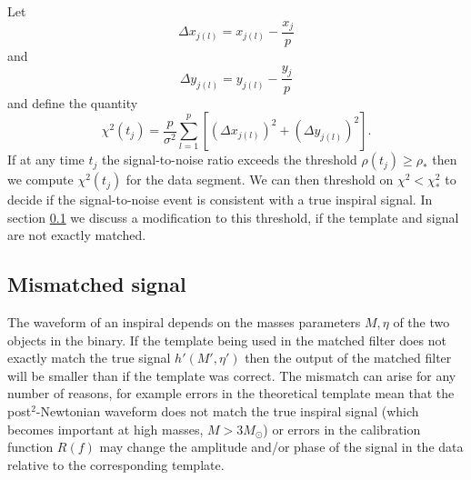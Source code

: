 Let
\begin{equation}
\Delta x_{j(l)} = x_{j(l)} - \frac{x_j}{p}
\end{equation}
and
\begin{equation}
\Delta y_{j(l)} = y_{j(l)} - \frac{y_j}{p}
\end{equation}
and define the quantity
\begin{equation}
\chi^2(t_j) = \frac{p}{\sigma^2} \sum_{l = 1}^p \left[ \left(\Delta x_{j(l)}\right)^2 + \left(\Delta y_{j(l)}\right)^2 \right].
\label{eq:chisqdefn}
\end{equation}
If at any time $t_j$ the signal-to-noise ratio
exceeds the threshold $\rho(t_j) \ge \rho_\ast$ then we compute $\chi^2(t_j)$
 for the data segment. We can then threshold on $\chi^2 < \chi^2_\ast$ to
decide if the signal-to-noise event is consistent with a true inspiral signal.
In section \ref{ss:mismatchedchisq} we discuss a modification to this
threshold, if the template and signal are not exactly matched.

\subsection{Mismatched signal}
\label{ss:mismatchedchisq}

The waveform of an inspiral depends on the masses parameters $M,\eta$ of the two
objects in the binary. If the template being used in the
matched filter does not exactly match the true signal
$h'(M',\eta')$ then the output of the matched filter will be smaller than if
the template was correct. The mismatch can arise for any number of reasons,
for example errors in the theoretical
template mean that the post$^2$-Newtonian waveform does not match the true
inspiral signal (which becomes important at high masses, $M > 3 M_\odot$) or
errors in the calibration function $R(f)$ may change the
amplitude and/or phase of the signal in the data relative to the corresponding
template.  

